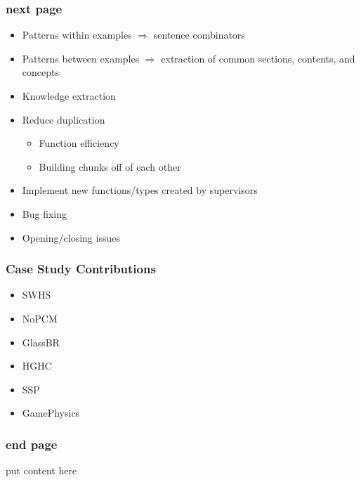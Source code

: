 \documentclass{beamer}
\begin{document}
\begin{frame}
\frametitle{next page}
\begin{itemize}
 \item<1-> Patterns within examples $\Rightarrow$ sentence combinators
 \item<2-> Patterns between examples $\Rightarrow$ extraction of common sections, contents, and concepts
 \item<3-> Knowledge extraction
 \item<4-> Reduce duplication
   \begin{itemize}
     \item Function efficiency
     \item Building chunks off of each other
   \end{itemize}
 \item<5-> Implement new functions/types created by supervisors
 \item<6-> Bug fixing
 \item<7-> Opening/closing issues
\end{itemize}
\end{frame}

\begin{frame}
\frametitle{Case Study Contributions}
\begin{itemize}
\item SWHS
\item NoPCM
\item GlassBR
\item HGHC
\item SSP
\item GamePhysics
\end{itemize}
\end{frame}

\begin{frame}
\frametitle{end page}
put content here
\end{frame}
\end{document}
